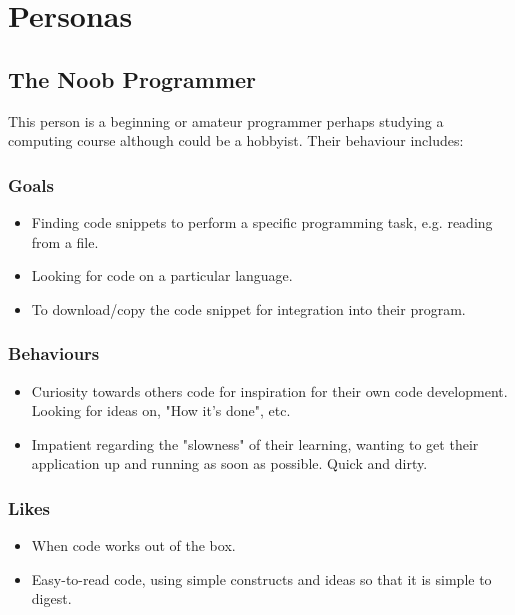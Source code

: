 \documentclass[11pt,a4paper]{article}
\begin{document}
\section{Personas}


\subsection{The Noob Programmer}

This person is a beginning or amateur programmer perhaps studying a
computing course although could be a hobbyist. Their behaviour includes:

\subsubsection{Goals}

\begin{itemize}
\item Finding code snippets to perform a specific programming task,
e.g. reading from a file.
\item Looking for code on a particular language.
\item To download/copy the code snippet for integration into their
program.
\end{itemize}

\subsubsection{Behaviours}

\begin{itemize}
\item Curiosity towards others code for inspiration for their own code
development. Looking for ideas on, "How it's done", etc.
\item Impatient regarding the "slowness" of their learning, wanting to
get their application up and running as soon as possible. Quick and
dirty.
\end{itemize}

\subsubsection{Likes}

\begin{itemize}
\item When code works out of the box.
\item Easy-to-read code, using simple constructs and ideas so that it
is simple to digest.
\end{itemize}
\end{document}
